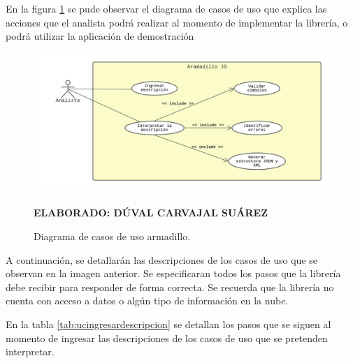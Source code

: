 En la figura \ref{fig:armadillocasodeuso} se pude observar el diagrama de casos de uso que explica las acciones que el analista podrá realizar al momento de implementar la librería, o podrá utilizar la aplicación de demostración


\begin{figure}[h!]
	\caption{Diagrama de casos de uso armadillo.}
	\includegraphics[width=15cm]{img/modelamientocasodeuso.png}
	\label{fig:armadillocasodeuso}
	\textbf{\\ \\ ELABORADO: DÚVAL CARVAJAL SUÁREZ}
\end{figure} 

A continuación, se detallarán las descripciones de los casos de uso que se observan en la imagen anterior. Se especificaran todos los pasos que la librería debe recibir para responder de forma correcta. Se recuerda que la librería no cuenta con acceso a datos o algún tipo de información en la nube.  

En la tabla \ref{tab:ucingresardescripcion} se detallan los pasos que se siguen al momento de ingresar las descripciones de los casos de uso que se pretenden interpretar.

\newpage

